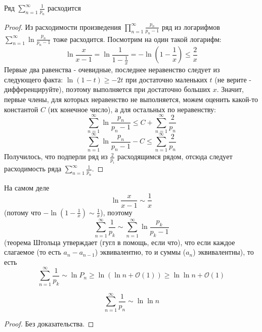 \begin{theorem} \thmslashn
  
  Ряд $\sum\limits_{n=1}^\infty\frac{1}{p_n}$ расходится
  \begin{proof} \thmslashn

    Из расходимости произведения $\prod\limits_{n=1}^\infty\frac{p_n}{p_n-1}$ ряд из логарифмов $\sum\limits_{n=1}^\infty\ln\frac{p_n}{p_n-1}$ тоже расходится. Посмотрим на один такой логарифм:
    $$\ln\frac{x}{x-1} =  \ln\frac{1}{1-\frac{1}{x}} = -\ln\left(1-\frac{1}{x}\right) \leqslant \frac{2}{x}$$
    Первые два равенства - очевидные, последнее неравенство следует из следующего факта: $\ln(1-t)\geqslant-2t$ при достаточно маленьких $t$ (не верите - дифференцируйте), поэтому выполняется при достаточно больших $x$. Значит, первые члены, для которых неравенство не выполняется, можем оценить какой-то константой $C$ (их конечное число), а для остальных по неравенству:
    $$\sum_{n=1}^\infty \ln \frac{p_n}{p_n -1}\leqslant C + \sum_{n=1}^\infty\frac{2}{p_n}$$
    $$\sum_{n=1}^\infty \ln \frac{p_n}{p_n -1} - C\leqslant \sum_{n=1}^\infty\frac{2}{p_n}$$
    Получилось, что подперли ряд из $\frac{2}{p_i}$ расходящимся рядом, отсюда следует расходимость ряда $\sum\limits_{n=1}^\infty\frac{1}{p_n}$.
  \end{proof}
  \begin{remark} \thmslashn

    На самом деле
    $$\ln\frac{x}{x-1} \sim \frac{1}{x}$$
    (потому что $-\ln\left(1 - \frac{1}{x}\right) \sim \frac{1}{x}$), поэтому
    $$\sum\limits_{n=1}^\infty\frac{1}{p_k} \sim \sum\limits_{n=1}^\infty \ln\frac{p_k}{p_k - 1}$$
    (теорема Штольца утверждает (гугл в помощь, если что), что если каждое слагаемое (то есть $a_n - a_{n-1}$) эквивалентно, то и суммы ($a_n$) эквивалентны), то есть
    $$\sum\limits_{n=1}^\infty\frac{1}{p_k} \sim \ln P_n \geqslant \ln(\ln n + \mathcal{O}(1)) \geqslant \ln\ln n + \mathcal{O}(1)$$
    \begin{statement} \thmslashn

      $$\sum_{n=1}^\infty\frac{1}{p_n} \sim \ln\ln n$$
      \begin{proof} \thmslashn

        Без доказательства.
      \end{proof}
    \end{statement}
  \end{remark}
\end{theorem}
